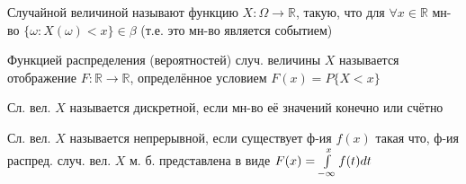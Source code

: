 
\OPR Случайной величиной называют функцию $X:\Omega\rightarrow\mathbb{R}$, такую, что для $\forall x\in\mathbb{R}$ мн-во $\{\omega : X(\omega)<x\}\in \beta$ (т.е. это мн-во является событием)

\OPR Функцией распределения (вероятностей) случ. величины $X$ называется отображение $F:\mathbb{R}\rightarrow\mathbb{R}$, определённое условием $F(x) = P\{X<x\}$

\OPR Сл. вел. $X$ называется дискретной, если мн-во её значений конечно или счётно

\OPR Сл. вел. $X$ называется непрерывной, если существует ф-ия $f(x)$ такая что, ф-ия распред. случ. вел. $X$ м. б. представлена в виде $F(x)=\int\limits_{-\infty}^{x}f(t)dt$

